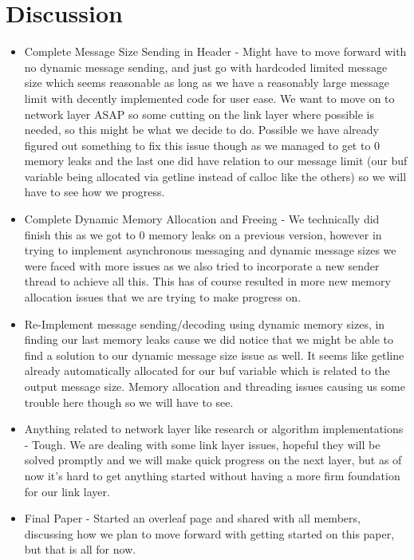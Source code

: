 \documentclass{article}
\begin{document}
\section*{Discussion}
\begin{itemize}
\item Complete Message Size Sending in Header - Might have to move forward with no dynamic message sending, and just go with hardcoded limited message size which seems reasonable as long as we have a reasonably large message limit with decently implemented code for user ease. We want to move on to network layer ASAP so some cutting on the link layer where possible is needed, so this might be what we decide to do. Possible we have already figured out something to fix this issue though as we managed to get to 0 memory leaks and the last one did have relation to our message limit (our buf variable being allocated via getline instead of calloc like the others) so we will have to see how we progress.
\item Complete Dynamic Memory Allocation and Freeing - We technically did finish this as we got to 0 memory leaks on a previous version, however in trying to implement asynchronous messaging and dynamic message sizes we were faced with more issues as we also tried to incorporate a new sender thread to achieve all this. This has of course resulted in more new memory allocation issues that we are trying to make progress on. 
\item Re-Implement message sending/decoding using dynamic memory sizes, in finding our last memory leaks cause we did notice that we might be able to find a solution to our dynamic message size issue as well. It seems like getline already automatically allocated for our buf variable which is related to the output message size. Memory allocation and threading issues causing us some trouble here though so we will have to see.
\item Anything related to network layer like research or algorithm implementations - Tough. We are dealing with some link layer issues, hopeful they will be solved promptly and we will make quick progress on the next layer, but as of now it's hard to get anything started without having a more firm foundation for our link layer. 
\item Final Paper - Started an overleaf page and shared with all members, discussing how we plan to move forward with getting started on this paper, but that is all for now.
\end{itemize}
\end{document}
